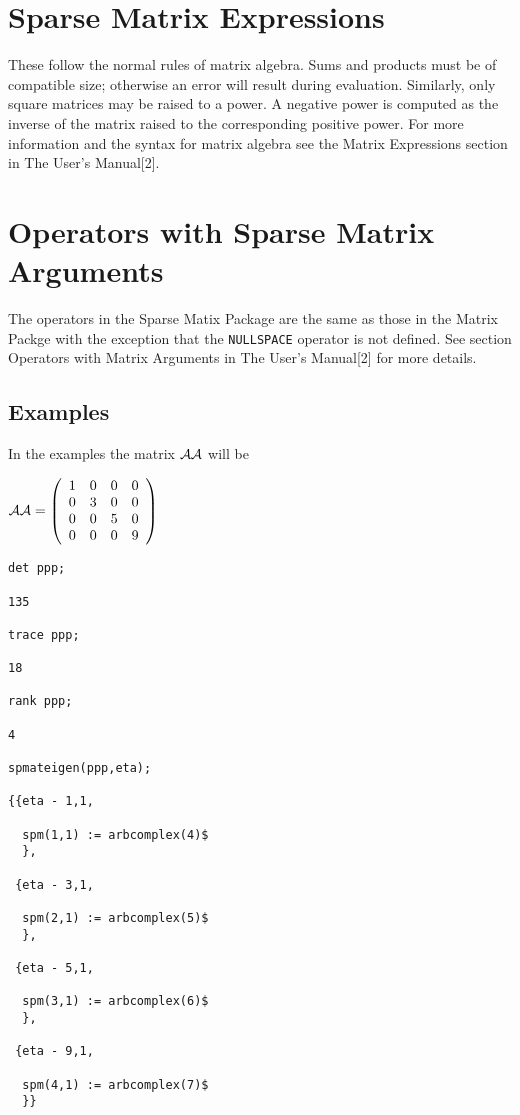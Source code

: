 \section{Sparse Matrix Expressions}
These follow the normal rules of matrix algebra. Sums and products must 
be of compatible size; otherwise an error will result during evaluation.
Similarly, only square matrices may be raised to a power.
A negative power is computed as the inverse of the matrix raised to the
corresponding positive power. For more information and the syntax for 
matrix algebra see the Matrix Expressions section in The \REDUCE{} 
User's Manual[2].

\section{Operators with Sparse Matrix Arguments}
The operators in the Sparse Matix Package are the same as those in the
Matrix Packge with the exception that the {\tt NULLSPACE} operator is 
not defined. See section Operators with Matrix Arguments in The 
\REDUCE{} User's Manual[2] for more details.
\subsection{Examples}
In the examples the matrix ${\cal AA}$ will be 

\begin{flushleft}
\begin{math}
{\cal AA} = \left( \begin{array}{cccc} 1 & 0 & 0 & 0 \\ 0 & 3 & 0 & 0 \\ 
0 & 0 & 5 & 0 \\ 0 & 0 & 0 & 9
\end{array} \right)
\end{math}
\end{flushleft}
\begin {verbatim}
det ppp;

135

trace ppp;

18

rank ppp;

4

spmateigen(ppp,eta);

{{eta - 1,1,

  spm(1,1) := arbcomplex(4)$
  },

 {eta - 3,1,

  spm(2,1) := arbcomplex(5)$
  },

 {eta - 5,1,

  spm(3,1) := arbcomplex(6)$
  },

 {eta - 9,1,

  spm(4,1) := arbcomplex(7)$
  }}
\end{verbatim}

